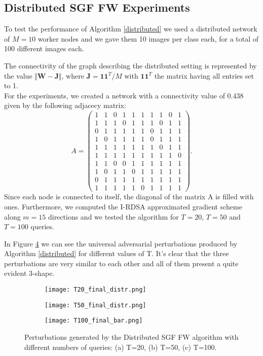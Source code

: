 \subsection{Distributed SGF FW Experiments}
To test the performance of Algorithm \ref{distributed} we used a distributed network of $M=10$ worker nodes and we
gave them 10 images per class each, for a total of 100 different images each.

The connectivity of the graph describing the distributed setting is represented by the value $\Vert \mathbf{W}- \mathbf{J} \Vert$,
where $\mathbf{J}= \mathbf{11}^T/M$ with $\mathbf{11}^T$ the matrix having all entries set to 1.\\ For the experiments, we created a network
with a connectivity value of 0.438 given by the following adjacecy
matrix:
\[ A =
\begin{pmatrix}
1& 1& 0& 1& 1& 1& 1& 1& 0& 1\\
1& 1& 1& 0& 1& 1& 1& 0& 1& 1\\
0& 1& 1& 1& 1& 1& 0& 1& 1& 1\\
1& 0& 1& 1& 1& 1& 0& 1& 1& 1\\
1& 1& 1& 1& 1& 1& 1& 0& 1& 1\\
1& 1& 1& 1& 1& 1& 1& 1& 1& 0\\
1& 1& 0& 0& 1& 1& 1& 1& 1& 1\\
1& 0& 1& 1& 0& 1& 1& 1& 1& 1\\
0& 1& 1& 1& 1& 1& 1& 1& 1& 1\\
1& 1& 1& 1& 1& 0& 1& 1& 1& 1
\end{pmatrix}
.\]
Since each node is connected to itself, the diagonal of the matrix A is filled with ones.
Furthermore, we computed the I-RDSA approximated gradient scheme along $m=15$ directions and we tested the algorithm for $T=20$, $T=50$ and $T=100$ queries.

In Figure \ref{fig:perturbations} we can see the universal adversarial perturbations produced by Algorithm \ref{distributed}
for different values of T. It's clear that the three perturbations are very similar to each other and all of them present a quite evident 3-shape.
\begin{figure}[h]
	\centering
	\begin{subfigure}[b]{0.15\textwidth}
		\centering
		\texttt{[image: T20\_final\_distr.png]}
		\caption{}
		\label{fig:distributed_perturbation_20}
	\end{subfigure}
	\hfill
	\begin{subfigure}[b]{0.15\textwidth}
		\texttt{[image: T50\_final\_distr.png]}
		\caption{}
		\label{fig:variance-distributed_perturbation_50}
	\end{subfigure}
	\hfill
	\begin{subfigure}[b]{0.15\textwidth}
		\texttt{[image: T100\_final\_bar.png]}
		\caption{}
		\label{fig:distributed_perturbation_100}
	\end{subfigure}
	\caption{{\small Perturbations generated by the Distributed SGF FW algorithm with different numbers of queries: (a) T=20, (b) T=50, (c) T=100.}}
	\label{fig:perturbations}
\end{figure}


